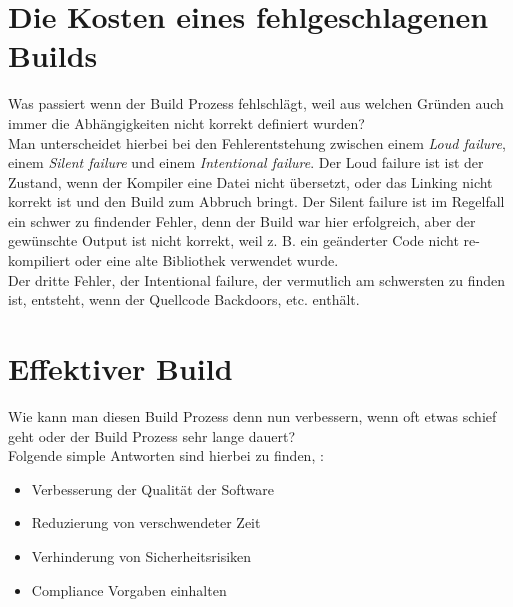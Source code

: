 \section{Die Kosten eines fehlgeschlagenen Builds}
Was passiert wenn der Build Prozess fehlschlägt, weil aus welchen Gründen auch immer die Abhängigkeiten nicht korrekt definiert wurden?
\\
Man unterscheidet hierbei bei den Fehlerentstehung zwischen einem \textit{Loud failure}, einem \textit{Silent failure} und einem \textit{Intentional failure}.
Der Loud failure ist ist der Zustand, wenn der Kompiler eine Datei nicht übersetzt, oder das Linking nicht korrekt ist und den Build zum Abbruch bringt.
Der Silent failure ist im Regelfall ein schwer zu findender Fehler, denn der Build war hier erfolgreich, aber der gewünschte Output ist nicht korrekt, weil \acs{z. B.} ein geänderter Code nicht re-kompiliert oder eine alte Bibliothek verwendet wurde.
\\
Der dritte Fehler, der Intentional failure, der vermutlich am  schwersten zu finden ist, entsteht, wenn der Quellcode Backdoors, \acs{etc.} enthält. \cite{software-analysis}

\section{Effektiver Build}
Wie kann man diesen Build Prozess denn nun verbessern, wenn oft etwas schief geht oder der Build Prozess sehr lange dauert?
\\
Folgende simple Antworten sind hierbei zu finden, \cite{software-analysis}:
\begin{itemize}
	\item Verbesserung der Qualität der Software
	\item Reduzierung von verschwendeter Zeit
	\item Verhinderung von Sicherheitsrisiken 
	\item Compliance Vorgaben einhalten 
\end{itemize}
